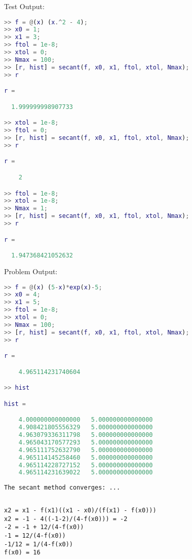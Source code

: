\documentclass[12pt]{article}
\makeatletter
\theoremstyle{homework}
\newenvironment{exercise}[1]
{\def\@currentlabel{#1}\exercisecore}
{\endexercisecore}
\makeatother
\begin{document}
Test Output:
\begin{lstlisting}[language=Matlab]
>> f = @(x) (x.^2 - 4);
>> x0 = 1;
>> x1 = 3;
>> ftol = 1e-8;
>> xtol = 0;
>> Nmax = 100;
>> [r, hist] = secant(f, x0, x1, ftol, xtol, Nmax);
>> r

r =

  1.999999998907733

>> xtol = 1e-8;
>> ftol = 0;
>> [r, hist] = secant(f, x0, x1, ftol, xtol, Nmax);
>> r

r =

    2

>> ftol = 1e-8;
>> xtol = 1e-8;
>> Nmax = 1;
>> [r, hist] = secant(f, x0, x1, ftol, xtol, Nmax);
>> r

r =

  1.947368421052632
\end{lstlisting}
Problem Output:
\begin{lstlisting}[language=Matlab]
>> f = @(x) (5-x)*exp(x)-5;
>> x0 = 4;
>> x1 = 5;
>> ftol = 1e-8;
>> xtol = 0;
>> Nmax = 100;
>> [r, hist] = secant(f, x0, x1, ftol, xtol, Nmax);
>> r

r =

    4.965114231740604

>> hist

hist =

    4.000000000000000   5.000000000000000
    4.908421805556329   5.000000000000000
    4.963079336311798   5.000000000000000
    4.965043170577293   5.000000000000000
    4.965111752632790   5.000000000000000
    4.965114145258460   5.000000000000000
    4.965114228727152   5.000000000000000
    4.965114231639022   5.000000000000000
\end{lstlisting}
\begin{verbatim}
The secant method converges: ... 
\end{verbatim}

\begin{exercise}{Chapter 4: 3}
\end{exercise}
\begin{verbatim}
\end{verbatim}

\begin{exercise}{Chapter 4: 8}
\end{exercise}
\begin{verbatim}
x2 = x1 - f(x1)((x1 - x0)/(f(x1) - f(x0)))
x2 = -1 - 4((-1-2)/(4-f(x0))) = -2
-2 = -1 + 12/(4-f(x0))
-1 = 12/(4-f(x0))
-1/12 = 1/(4-f(x0))
f(x0) = 16 
\end{verbatim}
\end{document}
